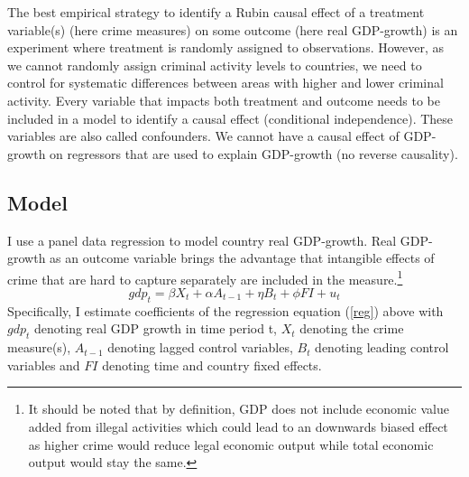 \documentclass[a4paper,12pt]{article}
\begin{document}
The best empirical strategy to identify a Rubin causal effect of a treatment variable(s) (here crime measures) on some outcome (here real GDP-growth) is an experiment where treatment is randomly assigned to observations. However, as we cannot randomly assign criminal activity levels to countries, we need to control for systematic differences between areas with higher and lower criminal activity. 
Every variable that impacts both treatment and outcome needs to be included in a model to identify a causal effect (conditional independence). These variables are also called confounders.
We cannot have a causal effect of GDP-growth on regressors that are used to explain GDP-growth (no reverse causality). 

\subsection{Model}

I use a panel data regression to model country real GDP-growth. 
Real GDP-growth as an outcome variable brings the advantage that intangible effects of crime that are hard to capture separately are included in the measure.\footnote{It should be noted that by definition, GDP does not include economic value added from illegal activities which could lead to an downwards biased effect as higher crime would reduce legal economic output while total economic output would stay the same. }
\begin{equation}
\label{reg}
gdp_t = \beta X_t+ \alpha A_{t-1} + \eta B_t + \phi FI  + u_t
\end{equation}
Specifically, I estimate coefficients of the regression equation (\ref{reg}) above with $gdp_t$ denoting real GDP growth in time period t, $X_t$ denoting the crime measure(s), $A_{t-1}$ denoting lagged control variables, $B_t$ denoting leading control variables and $FI$ denoting time and country fixed effects. 
\end{document}
